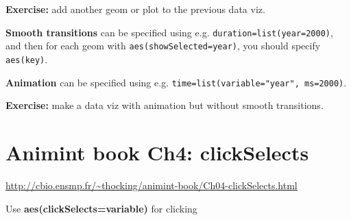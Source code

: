 \documentclass{article}
\begin{document}
\textbf{Exercise:} add another geom or plot to the previous data viz.

\hrulefill

\textbf{Smooth transitions} can be specified using
e.g. \texttt{duration=list(year=2000)},\\and then for each geom with
\texttt{aes(showSelected=year)}, you should specify \texttt{aes(key)}.

\textbf{Animation} can be specified using
e.g. \texttt{time=list(variable="year", ms=2000)}.

\textbf{Exercise:} make a data viz with animation but without smooth
transitions.

\section*{Animint book Ch4: clickSelects}
\url{http://cbio.ensmp.fr/~thocking/animint-book/Ch04-clickSelects.html}

\hrulefill

Use \textbf{aes(clickSelects=variable)} for clicking 
\end{document}
